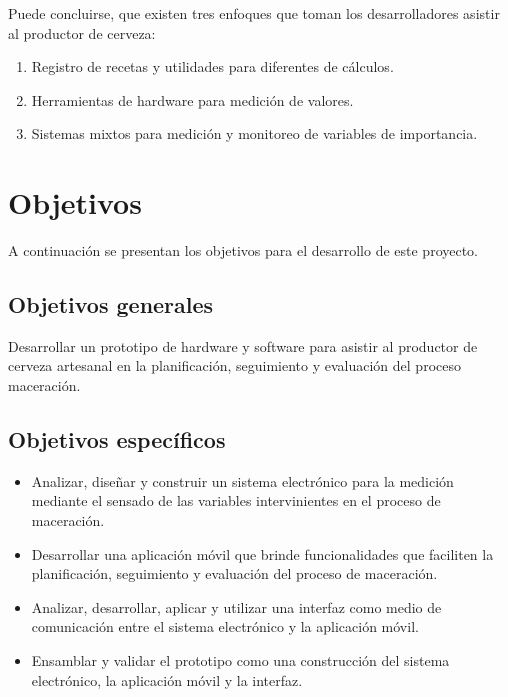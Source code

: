 \begin{itemize}
    \end{itemize}
    
    Puede concluirse, que existen tres enfoques que toman los desarrolladores asistir al productor de cerveza: 
   
    \begin{enumerate}
            \item Registro de recetas y utilidades para diferentes de cálculos.
            \item Herramientas de hardware para medición de valores.
            \item Sistemas mixtos para medición y monitoreo de variables de importancia.
    \end{enumerate}

\section{Objetivos}
\label{secccionObjetivos}
    \par
    A continuación se presentan los objetivos para el desarrollo de este proyecto.

    \subsection{Objetivos generales}
        \par
        Desarrollar un prototipo de hardware y software para asistir al productor de cerveza artesanal en la planificación, seguimiento y evaluación del proceso maceración. 
    \subsection{Objetivos específicos}
        \begin{itemize}
            \item Analizar, diseñar y construir un sistema electrónico para la medición mediante el sensado de las variables intervinientes en el proceso de maceración.
            
            \item Desarrollar una aplicación móvil que brinde funcionalidades que faciliten la planificación, seguimiento y evaluación del proceso de maceración.
            
            \item Analizar, desarrollar, aplicar y utilizar una interfaz como medio de comunicación entre el sistema electrónico y la aplicación móvil.
            
            \item Ensamblar y validar el prototipo como una construcción del sistema electrónico, la aplicación móvil y la interfaz.
        \end{itemize}
 
